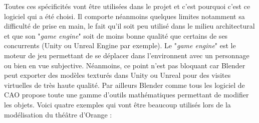 Toutes ces spécificités vont être utilisées dans le projet et c'est pourquoi c'est ce logiciel qui a été choisi. Il comporte néanmoins quelques limites notamment sa difficulté de prise en main, le fait qu'il soit peu utilisé dans le milieu architectural et que son "\textit{game engine}" soit de moins bonne qualité que certains de ses concurrents (Unity ou Unreal Engine par exemple). Le "\textit{game engine}" est le moteur de jeu permettant de se déplacer dans l'environnent avec un personnage ou bien en vue subjective. Néanmoins, ce point n'est pas bloquant car Blender peut exporter des modèles texturés dans Unity ou Unreal pour des visites virtuelles de très haute qualité. Par ailleurs Blender comme tous les logiciel de CAO propose toute une gamme d'outils mathématiques permettant de modifier les objets. Voici quatre exemples qui vont être beaucoup utilisés lors de la modélisation du théâtre d'Orange :

